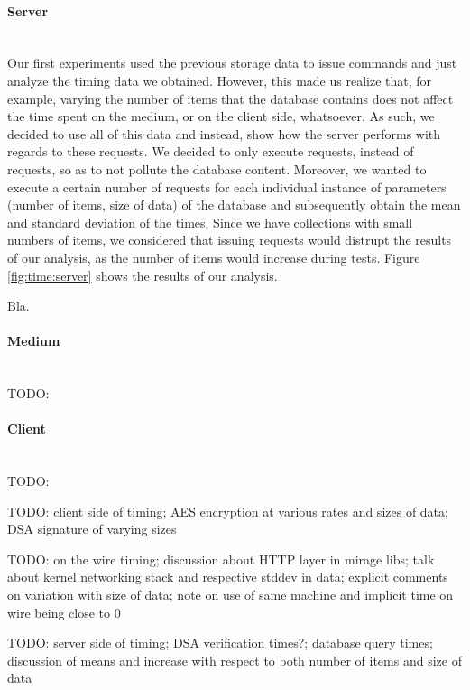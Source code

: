 \paragraph{Server} ~\\
Our first experiments used the previous storage data to issue  commands and just analyze the timing data we obtained.
However, this made us realize that, for example, varying the number of items that the database contains does not affect the time spent on the medium, or on the client side, whatsoever.
As such, we decided to use all of this data and instead, show how the server performs with regards to these requests.
We decided to only execute  requests, instead of  requests, so as to not pollute the database content.
Moreover, we wanted to execute a certain number of requests for each individual instance of parameters (number of items, size of data) of the database and subsequently obtain the mean and standard deviation of the times.
Since we have collections with small numbers of items, we considered that issuing  requests would distrupt the results of our analysis, as the number of items would increase during tests.
Figure \ref{fig:time:server} shows the results of our analysis.

Bla.\label{fig:time:server}

\paragraph{Medium} ~\\
TODO:

\paragraph{Client} ~\\
TODO:

TODO: client side of timing; AES encryption at various rates and sizes of data; DSA signature of varying sizes

TODO: on the wire timing; discussion about HTTP layer in mirage libs; talk about kernel networking stack and respective stddev in data; explicit comments on variation with size of data; note on use of same machine and implicit time on wire being close to 0

TODO: server side of timing; DSA verification times?; database query times; discussion of means and increase with respect to both number of items and size of data
